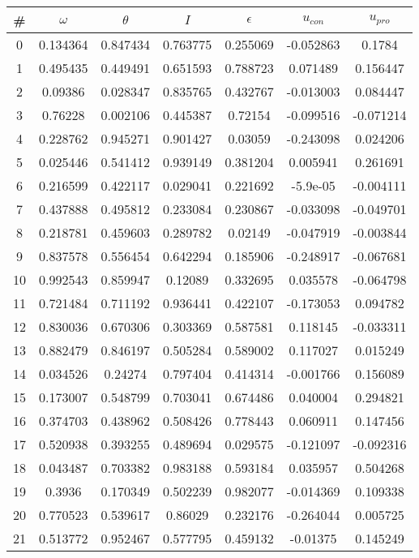 \begin{table}
\begin{tabular}{c|c|c|c|c|c|c}
\# & $\omega$ & $\theta$ & $I$ & $\epsilon$ & $u_{con}$ & $u_{pro}$\\
\hline
0 & 0.134364 & 0.847434 & 0.763775 & 0.255069 & -0.052863 & 0.1784\\
1 & 0.495435 & 0.449491 & 0.651593 & 0.788723 & 0.071489 & 0.156447\\
2 & 0.09386 & 0.028347 & 0.835765 & 0.432767 & -0.013003 & 0.084447\\
3 & 0.76228 & 0.002106 & 0.445387 & 0.72154 & -0.099516 & -0.071214\\
4 & 0.228762 & 0.945271 & 0.901427 & 0.03059 & -0.243098 & 0.024206\\
5 & 0.025446 & 0.541412 & 0.939149 & 0.381204 & 0.005941 & 0.261691\\
6 & 0.216599 & 0.422117 & 0.029041 & 0.221692 & -5.9e-05 & -0.004111\\
7 & 0.437888 & 0.495812 & 0.233084 & 0.230867 & -0.033098 & -0.049701\\
8 & 0.218781 & 0.459603 & 0.289782 & 0.02149 & -0.047919 & -0.003844\\
9 & 0.837578 & 0.556454 & 0.642294 & 0.185906 & -0.248917 & -0.067681\\
10 & 0.992543 & 0.859947 & 0.12089 & 0.332695 & 0.035578 & -0.064798\\
11 & 0.721484 & 0.711192 & 0.936441 & 0.422107 & -0.173053 & 0.094782\\
12 & 0.830036 & 0.670306 & 0.303369 & 0.587581 & 0.118145 & -0.033311\\
13 & 0.882479 & 0.846197 & 0.505284 & 0.589002 & 0.117027 & 0.015249\\
14 & 0.034526 & 0.24274 & 0.797404 & 0.414314 & -0.001766 & 0.156089\\
15 & 0.173007 & 0.548799 & 0.703041 & 0.674486 & 0.040004 & 0.294821\\
16 & 0.374703 & 0.438962 & 0.508426 & 0.778443 & 0.060911 & 0.147456\\
17 & 0.520938 & 0.393255 & 0.489694 & 0.029575 & -0.121097 & -0.092316\\
18 & 0.043487 & 0.703382 & 0.983188 & 0.593184 & 0.035957 & 0.504268\\
19 & 0.3936 & 0.170349 & 0.502239 & 0.982077 & -0.014369 & 0.109338\\
20 & 0.770523 & 0.539617 & 0.86029 & 0.232176 & -0.264044 & 0.005725\\
21 & 0.513772 & 0.952467 & 0.577795 & 0.459132 & -0.01375 & 0.145249\\

\end{tabular}
\end{table}
